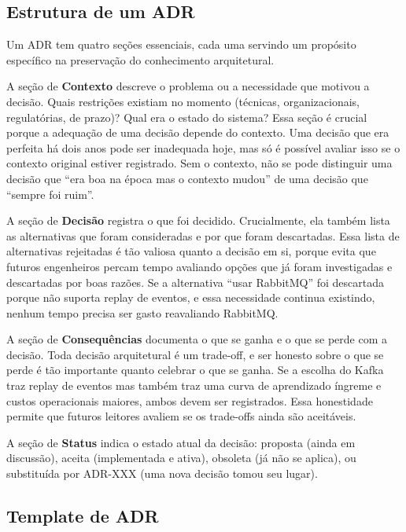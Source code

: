 \subsection{Estrutura de um ADR}

Um ADR tem quatro seções essenciais, cada uma servindo um propósito específico
na preservação do conhecimento arquitetural.

A seção de \textbf{Contexto} descreve o problema ou a necessidade que motivou a
decisão. Quais restrições existiam no momento (técnicas, organizacionais,
regulatórias, de prazo)? Qual era o estado do sistema? Essa seção é crucial porque
a adequação de uma decisão depende do contexto. Uma decisão que era perfeita há
dois anos pode ser inadequada hoje, mas só é possível avaliar isso se o contexto
original estiver registrado. Sem o contexto, não se pode distinguir uma decisão
que ``era boa na época mas o contexto mudou'' de uma decisão que ``sempre foi
ruim''.

A seção de \textbf{Decisão} registra o que foi decidido. Crucialmente, ela também
lista as alternativas que foram consideradas e por que foram descartadas. Essa
lista de alternativas rejeitadas é tão valiosa quanto a decisão em si, porque
evita que futuros engenheiros percam tempo avaliando opções que já foram
investigadas e descartadas por boas razões. Se a alternativa ``usar RabbitMQ''
foi descartada porque não suporta replay de eventos, e essa necessidade continua
existindo, nenhum tempo precisa ser gasto reavaliando RabbitMQ.

A seção de \textbf{Consequências} documenta o que se ganha e o que se perde com
a decisão. Toda decisão arquitetural é um trade-off, e ser honesto sobre o que
se perde é tão importante quanto celebrar o que se ganha. Se a escolha do Kafka
traz replay de eventos mas também traz uma curva de aprendizado íngreme e custos
operacionais maiores, ambos devem ser registrados. Essa honestidade permite que
futuros leitores avaliem se os trade-offs ainda são aceitáveis.

A seção de \textbf{Status} indica o estado atual da decisão: proposta (ainda em
discussão), aceita (implementada e ativa), obsoleta (já não se aplica), ou
substituída por ADR-XXX (uma nova decisão tomou seu lugar).

\subsection{Template de ADR}


